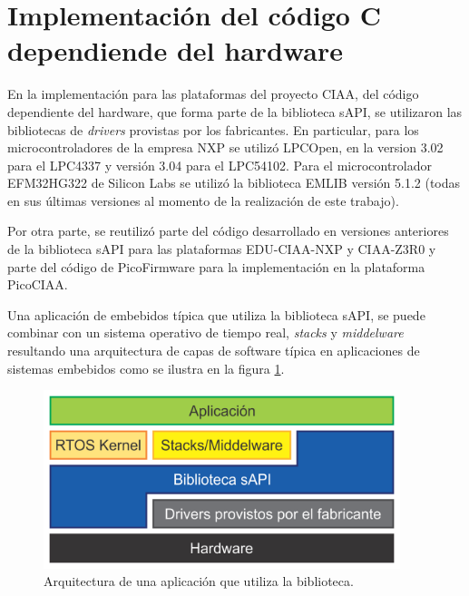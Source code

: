 \section{Implementación del código C dependiende del hardware}
\label{sec:codeImplementation}


En la implementación para las plataformas del proyecto CIAA, del código dependiente del hardware, que forma parte de la biblioteca sAPI, se utilizaron las bibliotecas de \emph{drivers} provistas por los fabricantes. En particular, para los microcontroladores de la empresa NXP se utilizó LPCOpen, en la version 3.02 para el LPC4337 y versión 3.04 para el LPC54102. Para el microcontrolador EFM32HG322 de Silicon Labs se utilizó la biblioteca EMLIB versión 5.1.2 (todas en sus últimas versiones al momento de la realización de este trabajo).

Por otra parte, se reutilizó parte del código desarrollado en versiones anteriores de la biblioteca sAPI para las plataformas EDU-CIAA-NXP y CIAA-Z3R0 y parte del código de PicoFirmware \citep{PicoAPI} para la implementación en la plataforma PicoCIAA.

Una aplicación de embebidos típica que utiliza la biblioteca sAPI, se puede combinar con un sistema operativo de tiempo real, \emph{stacks} y \emph{middelware} resultando una arquitectura de capas de software típica en aplicaciones de sistemas embebidos como se ilustra en la figura \ref{fig:sapiCapas2}.

\begin{figure}[!htbp]
\begin{center}  %
\includegraphics*[width=10.4cm]{Figures/sapiCapas2.png}
\par\caption{Arquitectura de una aplicación que utiliza la biblioteca.}\label{fig:sapiCapas2}
\end{center}
\end{figure}
